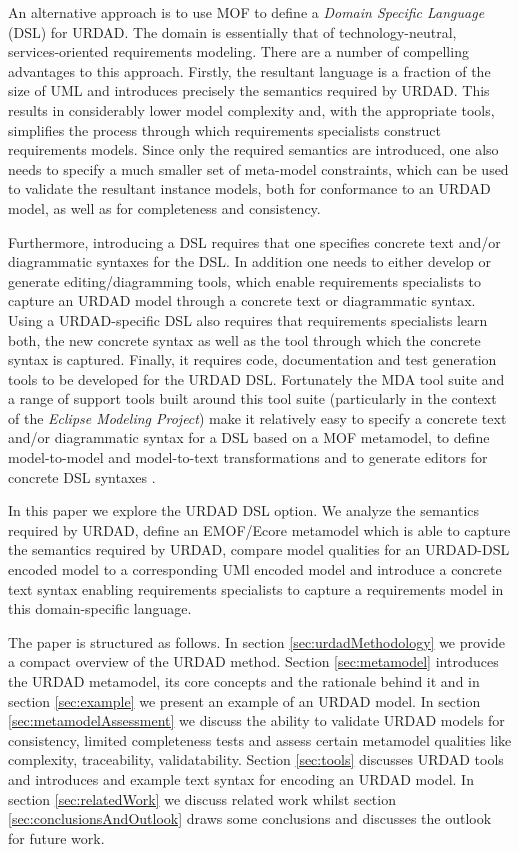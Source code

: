 An alternative approach is to use MOF to define a {\em Domain Specific Language} (DSL) for URDAD. The domain is essentially that of technology-neutral, services-oriented requirements modeling. There are a number of compelling advantages to this approach. Firstly, the resultant language is a fraction of the size of UML and introduces precisely the semantics required by URDAD. This results in considerably lower model complexity and, with the appropriate tools, simplifies the process through which requirements specialists construct requirements models. Since only the required semantics are introduced, one also needs to specify a much smaller set of meta-model constraints, which can be used to validate the resultant instance models, both for conformance to an URDAD model, as well as for completeness and consistency.

Furthermore, introducing a DSL requires that one specifies concrete text and/or diagrammatic syntaxes for the DSL. In addition one needs to either develop or generate editing/diagramming tools, which enable requirements specialists to capture an URDAD model through a concrete text or diagrammatic syntax. Using a URDAD-specific DSL also requires that requirements specialists learn both, the new concrete syntax as well as the tool through which the concrete syntax is captured. Finally, it requires code, documentation and test generation tools to be developed for the URDAD DSL. Fortunately the MDA tool suite and a range of support tools built around this tool suite (particularly in the context of the {\em Eclipse Modeling Project}) make it relatively easy to specify a concrete text and/or diagrammatic syntax for a DSL based on a MOF metamodel, to define model-to-model and model-to-text transformations and to generate editors for concrete DSL syntaxes \cite{gronback_model_2008,}.

In this paper we explore the URDAD DSL option. We analyze the semantics required by URDAD, define an EMOF/Ecore metamodel which is able to capture the semantics required by URDAD, compare model qualities for an URDAD-DSL encoded model to a corresponding UMl encoded model and introduce a concrete text syntax enabling requirements specialists to capture a requirements model in this domain-specific language.

The paper is structured as follows. In section \ref{sec:urdadMethodology} we provide a compact overview of the URDAD method. Section \ref{sec:metamodel} introduces the URDAD metamodel, its core concepts and the rationale behind it and in section \ref{sec:example} we present an example of an URDAD model. In section \ref{sec:metamodelAssessment} we discuss  the ability to validate URDAD models for consistency, limited completeness tests and assess certain metamodel qualities like complexity, traceability, validatability. Section \ref{sec:tools} discusses URDAD tools and introduces and example text syntax for encoding an URDAD model. In section \ref{sec:relatedWork} we discuss related work whilst section \ref{sec:conclusionsAndOutlook} draws some conclusions and discusses the outlook for future work.

